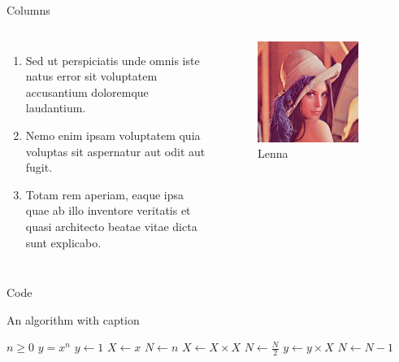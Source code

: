 \documentclass{beamer}
\begin{document}
\begin{frame}{Columns}
    \begin{columns}
        \begin{enumerate}
            \item Sed ut perspiciatis unde omnis iste natus error sit voluptatem accusantium doloremque laudantium.
            \item Nemo enim ipsam voluptatem quia voluptas sit aspernatur aut odit aut fugit.
            \item Totam rem aperiam, eaque ipsa quae ab illo inventore veritatis et quasi architecto beatae vitae dicta sunt explicabo.
        \end{enumerate}
        \begin{figure}
            \includegraphics[width=0.8\textwidth]{images/lenna.jpg}
            \caption{Lenna}
    \end{figure}
    \end{columns}
\end{frame}

\begin{frame}{Code}
    \begin{algorithm}[H]
        \caption{An algorithm with caption}
        \begin{algorithmic}
            \Require $n \geq 0$
            \Ensure $y = x^n$
            \State $y \gets 1$
            \State $X \gets x$
            \State $N \gets n$
                \State $X \gets X \times X$
                \State $N \gets \frac{N}{2}$  
                \State $y \gets y \times X$
                \State $N \gets N - 1$
            \EndIf
            \EndWhile
        \end{algorithmic}
    \end{algorithm}
\end{frame}
\end{document}
